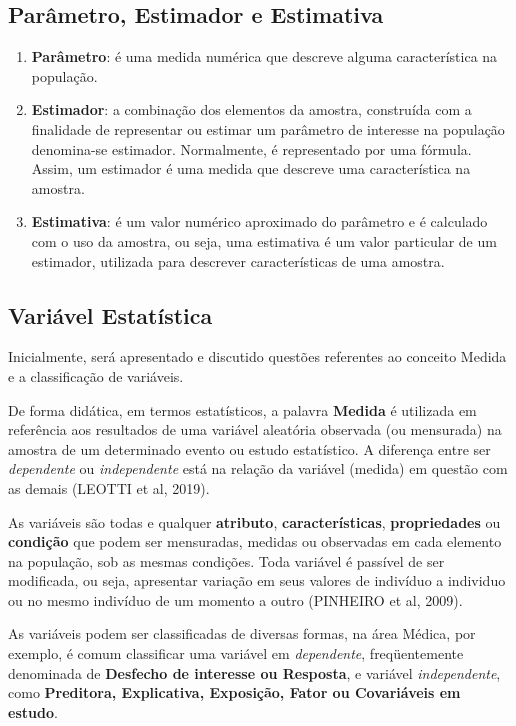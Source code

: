 \subsection{Parâmetro, Estimador e Estimativa}

\begin{enumerate}
\item \textbf{Parâmetro}: é uma medida numérica que descreve alguma característica na população.
\item \textbf{Estimador}: a combinação dos elementos da amostra, construída com a finalidade de representar ou estimar um parâmetro de interesse na população denomina-se estimador. Normalmente, é representado por uma fórmula. Assim, um estimador é uma medida que descreve uma característica na amostra.
\item \textbf{Estimativa}: é um valor numérico aproximado do parâmetro e é calculado com o uso da amostra, ou seja, uma estimativa é um valor particular de um estimador, utilizada para descrever características de uma amostra.
\end{enumerate}

\subsection{Variável Estatística}

Inicialmente, será apresentado e discutido questões referentes ao conceito Medida e a classificação de variáveis.\vskip0.3cm

De forma didática, em termos estatísticos, a palavra \textbf{Medida} é utilizada em referência aos resultados de uma variável aleatória observada (ou mensurada) na amostra de um determinado evento ou estudo estatístico. A diferença entre ser \textit{dependente} ou \textit{independente} está na relação da variável (medida) em questão com as demais (LEOTTI et al, 2019).\vskip0.3cm

As variáveis são todas e qualquer \textbf{atributo}, \textbf{características}, \textbf{propriedades} ou \textbf{condição} que podem ser mensuradas, medidas ou observadas em cada elemento na população, sob as mesmas condições. Toda variável é passível de ser modificada, ou seja, apresentar variação em seus valores de indivíduo a individuo ou no mesmo indivíduo de um momento a outro (PINHEIRO et al, 2009).\vskip0.3cm 

As variáveis podem ser classificadas de diversas formas, na área Médica, por exemplo, é comum classificar uma variável em \textit{dependente}, freqüentemente denominada de \textbf{Desfecho de interesse ou Resposta}, e variável \textit{independente}, como \textbf{Preditora, Explicativa, Exposição, Fator ou Covariáveis em estudo}. \vskip0.3cm

